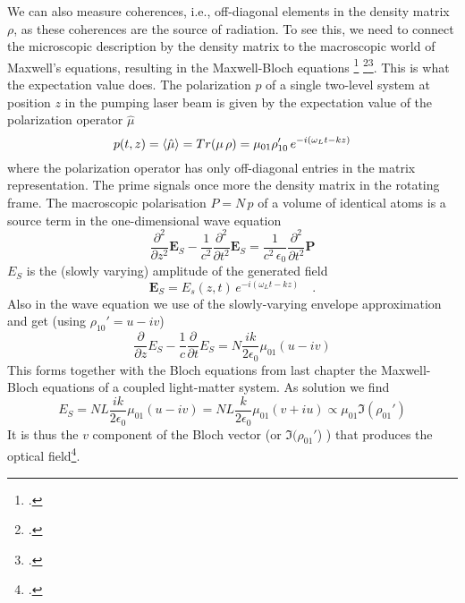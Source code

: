 We can also measure coherences, i.e., off-diagonal elements in the density matrix $\rho$, as these coherences are the source of radiation. To see this, we need to connect the microscopic description by the density matrix to the macroscopic world of Maxwell's equations, resulting in the Maxwell-Bloch equations \footcite[chapter 8.3]{MilonniEberly1988} \footcite[chapter 3.9]{Rand2016}\footcite{Meschede-OLL}. This is what the expectation value does. The  polarization $p$ of a single two-level system at position $z$ in the pumping laser beam is given by the expectation value of the polarization operator $\hat{\mu}$
\begin{equation}
 p(t,z) = \braket{\hat{\mu}} = Tr ( \mu \, \rho) = \mu_{01} \rho_{10}'  \, e^{-i (\omega_L t - k z)}  
\end{equation}
where the polarization operator has only off-diagonal entries in the matrix representation. The prime signals once more the density matrix in the rotating frame. The macroscopic polarisation $P = N \, p$ of a volume of identical atoms is a source term in the one-dimensional wave equation
\begin{equation}
  \frac{\partial^2}{\partial z^2} \boldsymbol{E}_S  - \frac{1}{c^2} \frac{\partial^2}{\partial t^2} \boldsymbol{E}_S 
 =  
\frac{1}{c^2\, \epsilon_0} \frac{\partial^2}{\partial t^2} \boldsymbol{P}  
\end{equation}
$E_S$ is the (slowly varying) amplitude of the generated field
\begin{equation}
 \boldsymbol{E}_S =   E_s(z,t) \, e^{-i (\omega_L t - k z)}   \quad .
\end{equation}
Also in the wave equation we  use of the slowly-varying envelope approximation and get (using $\rho_{10}' = u - i v$)
\begin{equation}
  \frac{\partial}{\partial z} E_S  - \frac{1}{c} \frac{\partial}{\partial t} E_S
 =  
N \frac{i k }{2 \epsilon_0}  \mu_{01} ( u - i v)
\end{equation}
This forms together with the Bloch equations from last chapter the Maxwell-Bloch equations of a coupled light-matter system. As solution we find
\begin{equation}
 E_S = N L \frac{i k }{2 \epsilon_0}  \mu_{01} ( u - i v)
 =
  N L \frac{k }{2 \epsilon_0}  \mu_{01} (v + i u)
  \propto \mu_{01} \Im (\rho_{01}' ) 
\end{equation}
It is thus the $v$ component of the Bloch vector (or $\Im (\rho_{01}'$) ) that produces the optical field\footcite[chapter V.B.1]{CT-atom-photon}.
%


